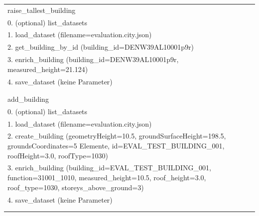 \begin{table}[htbp]
{\begin{tabular}{ll}
raise\_tallest\_building & \begin{minipage}{0.74\linewidth}\raggedright\footnotesize Sequenz 1:\\ 0. (optional) list\_datasets\\ 1. load\_dataset (filename=evaluation.city.json)\\ 2. get\_building\_by\_id (building\_id=DENW39AL10001p9r)\\ 3. enrich\_building (building\_id=DENW39AL10001p9r, measured\_height=21.124)\\ 4. save\_dataset (keine Parameter)\\ \\\end{minipage} \\
add\_building & \begin{minipage}{0.74\linewidth}\raggedright\footnotesize Sequenz 1:\\ 0. (optional) list\_datasets\\ 1. load\_dataset (filename=evaluation.city.json)\\ 2. create\_building (geometryHeight=10.5, groundSurfaceHeight=198.5, groundsCoordinates=5 Elemente, id=EVAL\_TEST\_BUILDING\_001, roofHeight=3.0, roofType=1030)\\ 3. enrich\_building (building\_id=EVAL\_TEST\_BUILDING\_001, function=31001\_1010, measured\_height=10.5, roof\_height=3.0, roof\_type=1030, storeys\_above\_ground=3)\\ 4. save\_dataset (keine Parameter)\\ \\\end{minipage} \\
\bottomrule
\end{tabular}
}
\end{table}